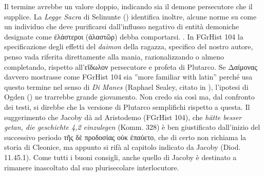 {            %
            Il termine avrebbe un valore doppio, indicando sia il demone persecutore che il supplice. La \emph{Legge Sacra} di Selinunte (\cite[68s]{Giuliani1998}) identifica inoltre, alcune norme su come un individuo che deve purificarsi dall'influsso negativo di entità demoniche designate come \textgreek{ἐλάστεροι} (\textgreek{ἀλαστῶρ}) debba comportarsi. \cite[114]{Ogden2002}. In FGrHist 104 la specificazione degli effetti del \emph{daimon} della ragazza, specifico del nostro autore, penso vada riferita direttamente alla mania, razionalizzando o almeno completando, rispetto all'\textgreek{εἴδωλον} persecutore e profeta di Plutarco. Se \textgreek{Δαίμονας} davvero mostrasse come FGrHist 104 sia ''more familiar with latin'' perché usa questo termine nel senso di \emph{Di Manes} (Raphael Sealey, citato in \cite[259 n.7]{Frost2005}), l'ipotesi di Ogden (\cite*[121s]{Ogden2002}) ne trarrebbe grande giovamento. Non credo sia così ma, dal confronto dei testi, si direbbe che  la versione di Plutarco semplifichi rispetto a questa.  
            Il suggerimento che Jacoby dà ad Aristodemo (FGrHist 104), che \emph{hätte besser getan, die geschichte 4,2 einzulegen} (Komm. 328) è ben giustificato dall'inizio del successivo periodo \textgreek{τῆς δὲ προδοσίας οὐκ ἐπαύετο}, che di certo non richiama la storia di Cleonice, ma appunto si rifà al capitolo indicato da Jacoby (Diod. 11.45.1). Come tutti i buoni consigli, anche quello di Jacoby è destinato a rimanere inascoltato dal suo plurisecolare interlocutore.
}
